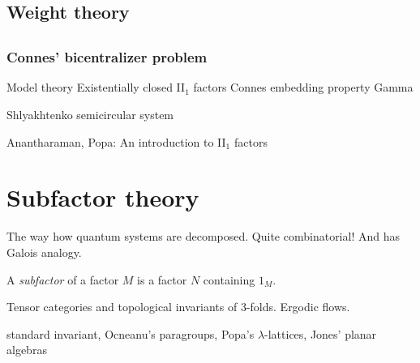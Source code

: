 \documentclass{../../large}
\begin{document}
\begin{prb}

\end{prb}




\chapter{Weight theory}





\chapter{}
\section{Connes' bicentralizer problem}










Model theory
Existentially closed II$_1$ factors
Connes embedding
property Gamma

Shlyakhtenko semicircular system


Anantharaman, Popa: An introduction to II$_1$ factors





\part{Subfactor theory}






The way how quantum systems are decomposed.
Quite combinatorial!
And has Galois analogy.

\begin{prb}
A \emph{subfactor} of a factor $M$ is a factor $N$ containing $1_M$.
\end{prb}

Tensor categories and topological invariants of 3-folds.
Ergodic flows.



standard invariant, Ocneanu's paragroups, Popa's $\lambda$-lattices, Jones' planar algebras
\end{document}
